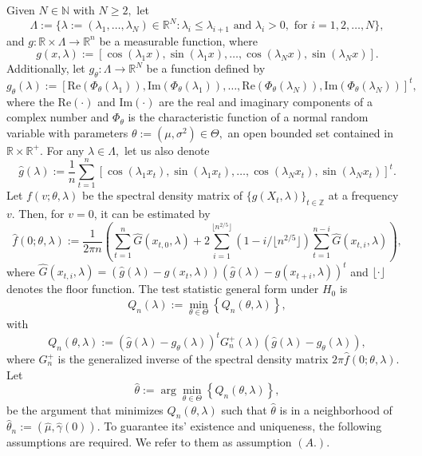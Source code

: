 Given \(N \in\mathbb{N}\) with \(N \geq 2,\) let
\[
\Lambda :=\{\lambda:=(\lambda_1, \ldots, \lambda_N) \in \mathbb{R}^N: \lambda_i \leq \lambda_{i+1} \text{ and } \lambda_i > 0, \text{ for }  i = 1,2,\ldots, N \},
\]
and \(g:\mathbb{R}\times \Lambda \rightarrow \mathbb{R}^n\) be a measurable function, where
\[
 g(x,\lambda):= [\cos(\lambda_1x),\sin(\lambda_1x),\ldots,\cos(\lambda_Nx),\sin(\lambda_Nx)].
\]
Additionally, let \(g_\theta:\Lambda \rightarrow \mathbb{R}^N\) be a function defined by
\[
 g_\theta(\lambda) := \left[\mbox{Re}(\Phi_\theta(\lambda_1)),\mbox{Im}(\Phi_\theta(\lambda_1)),\ldots,\mbox{Re}(\Phi_\theta(\lambda_N)),\mbox{Im}(\Phi_\theta(\lambda_N))  \right]^t,
\]
where the \(\mbox{Re}(\cdot)\) and \(\mbox{Im}(\cdot)\) are the real and imaginary components of a complex number and \(\Phi_\theta\) is the characteristic function of a normal random variable with parameters \(\theta := (\mu,\sigma^2)\in \Theta,\) an open bounded set contained in \(\mathbb{R}\times \mathbb{R}^+\). For any \(\lambda\in\Lambda,\) let us also denote
\[
 \widehat{g}(\lambda) := \dfrac{1}{n}\sum_{t=1}^n [\cos(\lambda_1 x_t),\sin(\lambda_1x_t),\ldots,\cos(\lambda_N x_t),\sin(\lambda_N x_t)]^t.
\]
Let \(f(v;\theta,\lambda)\) be the spectral density matrix of \(\{g(X_t,\lambda)\}_{t \in\mathbb{Z}}\) at a frequency \(v.\)
Then, for \(v = 0\), it can be estimated by
\[
 \widehat{f}(0;\theta,\lambda) := \dfrac{1}{2\pi n}\left(\sum_{t=1}^n  \widehat{G}(x_{t,0},\lambda) +2\sum_{i=1}^{\lfloor  n^{2/5}\rfloor}(1 -i/\lfloor n^{2/5}  \rfloor)\sum_{t=1}^{n-i}\widehat{G}(x_{t,i},\lambda) \right),
\]
where \(\widehat{G}(x_{t,i},\lambda) = (\widehat{g}(\lambda) -g(x_{t},\lambda))(\widehat{g}(\lambda) -g(x_{t+i},\lambda))^t\) and \(\lfloor \cdot \rfloor\) denotes the floor function. The test statistic general form under \(H_0\) is
\[
 Q_n(\lambda) := \min_{\theta \in \Theta} \left\{ Q_n(\theta,\lambda) \right\},
\]
with
\[
 Q_n(\theta,\lambda):=(\widehat{g}(\lambda)-g_\theta(\lambda))^tG_n^+(\lambda)(\widehat{g}(\lambda)-g_\theta(\lambda)),
\]
where \(G^{+}_n\) is the generalized inverse of the spectral density matrix \(2 \pi  \widehat{f}(0;\theta,\lambda)\). Let
\[
 \widehat{\theta} := \arg \min_{\theta \in \Theta} \left\{ Q_n(\theta,\lambda) \right\},
\]
be the argument that minimizes \(Q_n(\theta,\lambda)\) such that \(\widehat{\theta}\) is in a neighborhood of \(\widehat{\theta}_n := (\widehat{\mu},\widehat{\gamma}(0))\). To guarantee its' existence and uniqueness, the following assumptions are required. We refer to them as assumption \((A.)\).

